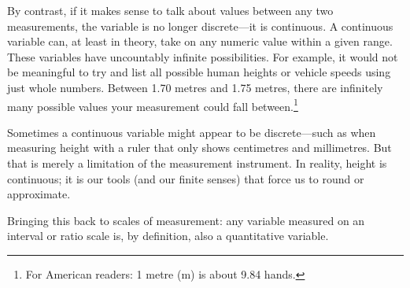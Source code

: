 By contrast, if it makes sense to talk about values between any two measurements, the variable is no longer discrete—it is continuous. A \gls{continuous variable} can, at least in theory, take on any numeric value within a given range. These variables have uncountably infinite possibilities. For example, it would not be meaningful to try and list all possible human heights or vehicle speeds using just whole numbers. Between 1.70 metres and 1.75 metres, there are infinitely many possible values your measurement could fall between.\footnote{For American readers: 1 metre (m) is about 9.84 hands.}

Sometimes a continuous variable might appear to be discrete—such as when measuring height with a ruler that only shows centimetres and millimetres. But that is merely a limitation of the measurement instrument. In reality, height is continuous; it is our tools (and our finite senses) that force us to round or approximate.

Bringing this back to scales of measurement: any variable measured on an interval or ratio scale is, by definition, also a quantitative variable.










































